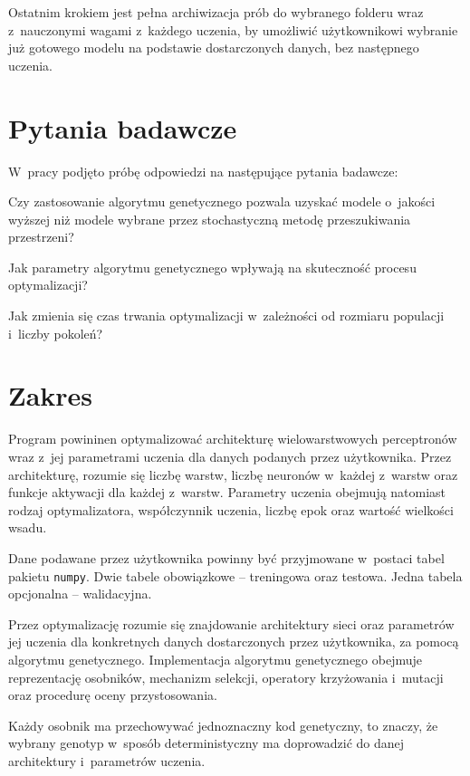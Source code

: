 Ostatnim krokiem jest pełna archiwizacja prób
do wybranego folderu wraz z~nauczonymi wagami
z~każdego uczenia, by umożliwić użytkownikowi
wybranie już gotowego modelu
na podstawie dostarczonych danych,
bez następnego uczenia.

\section*{Pytania badawcze}
W~pracy podjęto próbę odpowiedzi
na następujące pytania badawcze:
\begin{nospitemize}
  \item Czy zastosowanie algorytmu genetycznego
    pozwala uzyskać modele o~jakości wyższej
    niż modele wybrane przez stochastyczną
    metodę przeszukiwania przestrzeni?
  \item Jak parametry algorytmu genetycznego wpływają
    na skuteczność procesu optymalizacji?
  \item Jak zmienia się czas trwania optymalizacji
    w~zależności od rozmiaru populacji i~liczby pokoleń?
\end{nospitemize}

\section*{Zakres}
Program powininen optymalizować
architekturę wielowarstwowych perceptronów
wraz z~jej parametrami uczenia
dla danych podanych przez użytkownika.
Przez architekturę,
rozumie się liczbę warstw,
liczbę neuronów w~każdej z~warstw
oraz funkcje aktywacji dla każdej z~warstw.
Parametry uczenia obejmują natomiast
rodzaj optymalizatora,
współczynnik uczenia, liczbę epok
oraz wartość wielkości wsadu.

Dane podawane przez użytkownika
powinny być przyjmowane w~postaci
tabel pakietu \texttt{numpy}.
Dwie tabele obowiązkowe -- treningowa oraz testowa.
Jedna tabela opcjonalna -- walidacyjna.

Przez optymalizację rozumie się znajdowanie
architektury sieci oraz parametrów jej uczenia
dla konkretnych danych dostarczonych przez użytkownika,
za pomocą algorytmu genetycznego.
Implementacja algorytmu genetycznego obejmuje
reprezentację osobników, mechanizm selekcji,
operatory krzyżowania i~mutacji
oraz procedurę oceny przystosowania.

Każdy osobnik ma przechowywać
jednoznaczny kod genetyczny, to znaczy,
że wybrany genotyp w~sposób
deterministyczny ma doprowadzić
do danej architektury
i~parametrów uczenia.

